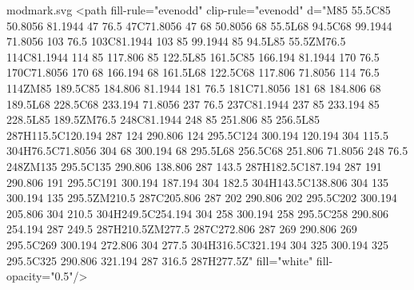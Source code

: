 \begin{filecontents}[noheader]{modmark.svg}
	<path fill-rule="evenodd" clip-rule="evenodd" d="M85 55.5C85 50.8056 81.1944 47 76.5 47C71.8056 47 68 50.8056 68 55.5L68 94.5C68 99.1944 71.8056 103 76.5 103C81.1944 103 85 99.1944 85 94.5L85 55.5ZM76.5 114C81.1944 114 85 117.806 85 122.5L85 161.5C85 166.194 81.1944 170 76.5 170C71.8056 170 68 166.194 68 161.5L68 122.5C68 117.806 71.8056 114 76.5 114ZM85 189.5C85 184.806 81.1944 181 76.5 181C71.8056 181 68 184.806 68 189.5L68 228.5C68 233.194 71.8056 237 76.5 237C81.1944 237 85 233.194 85 228.5L85 189.5ZM76.5 248C81.1944 248 85 251.806 85 256.5L85 287H115.5C120.194 287 124 290.806 124 295.5C124 300.194 120.194 304 115.5 304H76.5C71.8056 304 68 300.194 68 295.5L68 256.5C68 251.806 71.8056 248 76.5 248ZM135 295.5C135 290.806 138.806 287 143.5 287H182.5C187.194 287 191 290.806 191 295.5C191 300.194 187.194 304 182.5 304H143.5C138.806 304 135 300.194 135 295.5ZM210.5 287C205.806 287 202 290.806 202 295.5C202 300.194 205.806 304 210.5 304H249.5C254.194 304 258 300.194 258 295.5C258 290.806 254.194 287 249.5 287H210.5ZM277.5 287C272.806 287 269 290.806 269 295.5C269 300.194 272.806 304 277.5 304H316.5C321.194 304 325 300.194 325 295.5C325 290.806 321.194 287 316.5 287H277.5Z" fill="white" fill-opacity="0.5"/>

\end{filecontents}
